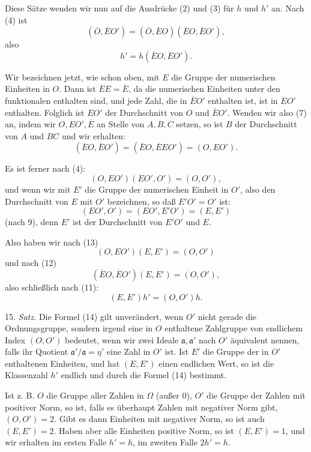 \documentclass[11pt]{article}
\begin{document}
Diese Sätze wenden wir nun auf die Ausdrücke (2) und (3) für \(h\) und \(h'\) an. Nach (4) ist
\begin{equation}
 (\overline O,\overline EO')=(\overline O,\overline EO)(\overline EO,\overline EO'),
\tag{10}
\end{equation}
also
\begin{equation}
 h'=h(\overline EO,\overline EO').
\tag{11}
\end{equation}

Wir bezeichnen jetzt, wie schon oben, mit \(E\) die Gruppe der numerischen Einheiten in \(O\). Dann ist \(\overline EE=\overline E\), da die numerischen Einheiten unter den funktionalen enthalten sind, und jede Zahl, die in \(\overline EO'\) enthalten ist, ist in \(EO'\) enthalten. Folglich ist \(EO'\) der Durchschnitt von \(O\) und \(\overline EO'\). Wenden wir also (7) an, indem wir \(O,EO',\overline E\) an Stelle von \(A,B,C\) setzen, so ist \(B\) der Durchschnitt von \(A\) und \(BC\) und wir erhalten:
\begin{equation}
 (\overline EO,\overline EO')=(\overline EO,\overline EEO')=(O,EO').
\tag{12}
\end{equation}

Es ist ferner nach (4):
\begin{equation}
 (O,EO')(EO',O')=(O,O'),
\tag{13}
\end{equation}
und wenn wir mit \(E'\) die Gruppe der numerischen Einheit in \(O'\), also den Durchschnitt von \(E\) mit \(O'\) bezeichnen, so daß \(E'O'=O'\) ist:
\[
 (EO',O')=(EO',E'O')=(E,E')
\]
(nach 9), denn \(E'\) ist der Durchschnitt von \(E'O'\) und \(E\).

Also haben wir nach (13)
\[
 (O,EO')(E,E')=(O,O')
\]
und nach (12)
\[
 (\overline EO,\overline EO')(E,E')=(O,O'),
\]
also schließlich nach (11):
\begin{equation}
 (E,E')h'=(O,O')h.
\tag{14}
\end{equation}

15. \emph{Satz.} Die Formel (14) gilt unverändert, wenn \(O'\) nicht gerade die Ordnungsgruppe, sondern irgend eine in \(O\) enthaltene Zahlgruppe von endlichem Index \((O,O')\) bedeutet, wenn wir zwei Ideale \(\mathfrak a,\mathfrak a'\) nach \(O'\) äquivalent nennen, falls ihr Quotient \(\mathfrak a'/\mathfrak a=\eta'\) eine Zahl in \(O'\) ist. Ist \(E'\) die Gruppe der in \(O'\) enthaltenen Einheiten, und hat \((E,E')\) einen endlichen Wert, so ist die Klassenzahl \(h'\) endlich und durch die Formel (14) bestimmt.

Ist z. B. \(O\) die Gruppe aller Zahlen in \(\Omega\) (außer \(0\)), \(O'\) die Gruppe der Zahlen mit positiver Norm, so ist, falls es überhaupt Zahlen mit negativer Norm gibt, \((O,O')=2\). Gibt es dann Einheiten mit negativer Norm, so ist auch \((E,E')=2\). Haben aber alle Einheiten positive Norm, so ist \((E,E')=1\), und wir erhalten im ersten Falle \(h'=h\), im zweiten Falle \(2h'=h\).
\end{document}

